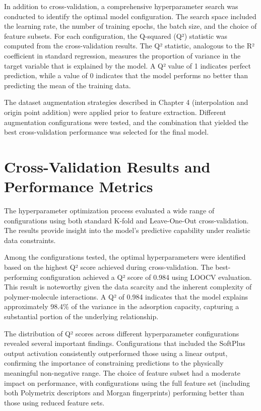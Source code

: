 In addition to cross-validation, a comprehensive hyperparameter search was conducted to identify the optimal model configuration. The search space included the learning rate, the number of training epochs, the batch size, and the choice of feature subsets. For each configuration, the Q-squared (Q²) statistic was computed from the cross-validation results. The Q² statistic, analogous to the R² coefficient in standard regression, measures the proportion of variance in the target variable that is explained by the model. A Q² value of 1 indicates perfect prediction, while a value of 0 indicates that the model performs no better than predicting the mean of the training data.

The dataset augmentation strategies described in Chapter 4 (interpolation and origin point addition) were applied prior to feature extraction. Different augmentation configurations were tested, and the combination that yielded the best cross-validation performance was selected for the final model.

\section{Cross-Validation Results and Performance Metrics}
\label{sec:cv_results}

The hyperparameter optimization process evaluated a wide range of configurations using both standard K-fold and Leave-One-Out cross-validation. The results provide insight into the model's predictive capability under realistic data constraints.

Among the configurations tested, the optimal hyperparameters were identified based on the highest Q² score achieved during cross-validation. The best-performing configuration achieved a Q² score of 0.984 using LOOCV evaluation. This result is noteworthy given the data scarcity and the inherent complexity of polymer-molecule interactions. A Q² of 0.984 indicates that the model explains approximately 98.4\% of the variance in the adsorption capacity, capturing a substantial portion of the underlying relationship.

The distribution of Q² scores across different hyperparameter configurations revealed several important findings. Configurations that included the SoftPlus output activation consistently outperformed those using a linear output, confirming the importance of constraining predictions to the physically meaningful non-negative range. The choice of feature subset had a moderate impact on performance, with configurations using the full feature set (including both Polymetrix descriptors and Morgan fingerprints) performing better than those using reduced feature sets.

